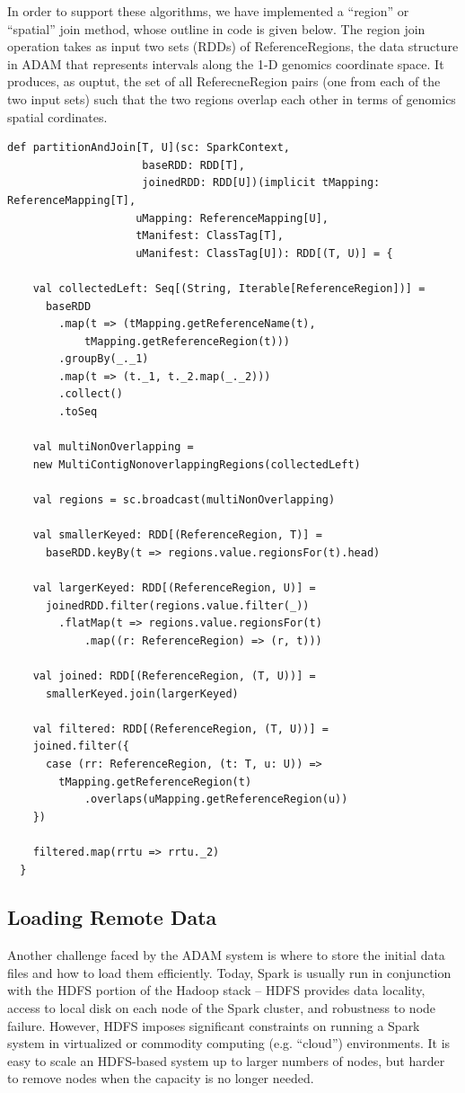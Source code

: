 \documentclass{acm_proc_article-sp}
\begin{document}
In order to support these algorithms, we have implemented a ``region'' or ``spatial'' join  method, whose outline in code is given below.  
The region join operation takes as input two sets (RDDs) of ReferenceRegions, the data structure in ADAM that represents intervals along the 1-D genomics coordinate space.  
It produces, as ouptut, the set of all ReferecneRegion pairs (one from each of the two input sets) such that the two regions overlap each other in terms of genomics spatial cordinates. 

\begin{lstlisting}
def partitionAndJoin[T, U](sc: SparkContext,
					 baseRDD: RDD[T],
					 joinedRDD: RDD[U])(implicit tMapping: ReferenceMapping[T],
					uMapping: ReferenceMapping[U],
					tManifest: ClassTag[T],
					uManifest: ClassTag[U]): RDD[(T, U)] = {

    val collectedLeft: Seq[(String, Iterable[ReferenceRegion])] =
      baseRDD
        .map(t => (tMapping.getReferenceName(t), 
			tMapping.getReferenceRegion(t))) 
        .groupBy(_._1) 
        .map(t => (t._1, t._2.map(_._2))) 
        .collect() 
        .toSeq 

    val multiNonOverlapping = 
	new MultiContigNonoverlappingRegions(collectedLeft)

    val regions = sc.broadcast(multiNonOverlapping)

    val smallerKeyed: RDD[(ReferenceRegion, T)] =
      baseRDD.keyBy(t => regions.value.regionsFor(t).head)

    val largerKeyed: RDD[(ReferenceRegion, U)] =
      joinedRDD.filter(regions.value.filter(_))
        .flatMap(t => regions.value.regionsFor(t)
			.map((r: ReferenceRegion) => (r, t)))

    val joined: RDD[(ReferenceRegion, (T, U))] =
      smallerKeyed.join(largerKeyed)

    val filtered: RDD[(ReferenceRegion, (T, U))] = 
	joined.filter({
	  case (rr: ReferenceRegion, (t: T, u: U)) =>
		tMapping.getReferenceRegion(t)
			.overlaps(uMapping.getReferenceRegion(u))
	})

    filtered.map(rrtu => rrtu._2)
  }
\end{lstlisting}


\subsection{Loading Remote Data}
\label{sec:loading-remote-data}

Another challenge faced by the ADAM system is where to store the initial data files and how to load them efficiently.  
Today, Spark is usually run in conjunction with the HDFS portion of the Hadoop stack -- HDFS provides data locality, access to local disk on each node of the Spark cluster, and robustness to node failure.  
However, HDFS imposes significant constraints on running a Spark system in virtualized or commodity computing (e.g. ``cloud'') environments.  It is easy to scale an HDFS-based system up to larger numbers of nodes, but harder to remove nodes when the capacity is no longer needed.  
\end{document}
